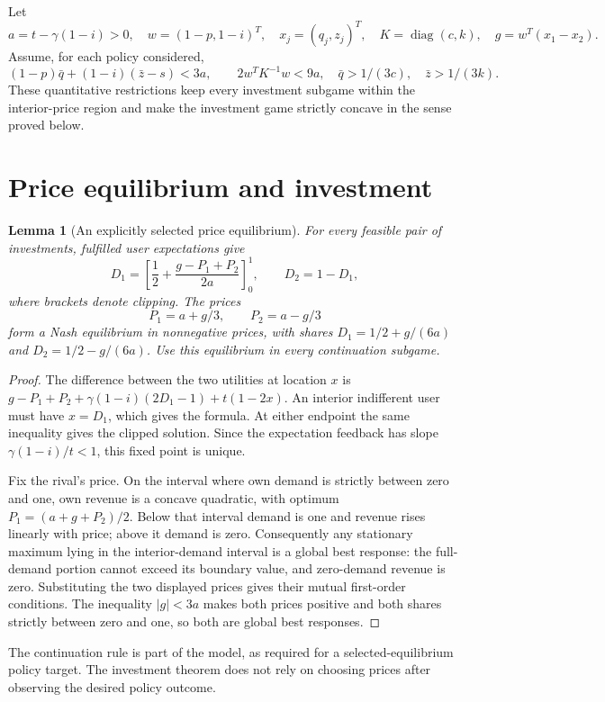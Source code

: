 \documentclass[11pt,a4paper]{article}
\newtheorem{lemma}[theorem]{Lemma}
\theoremstyle{definition}
\theoremstyle{remark}
\begin{document}
Let
\[
 a=t-\gamma(1-i)>0,\quad w=(1-p,1-i)^T,\quad
 x_j=(q_j,z_j)^T,\quad K=\operatorname{diag}(c,k),\quad
 g=w^T(x_1-x_2).
\]
Assume, for each policy considered,
\begin{equation}\label{eq:restrictions}
 (1-p)\bar q+(1-i)(\bar z-s)<3a,\qquad
 2w^TK^{-1}w<9a,
 \quad \bar q>1/(3c),\quad \bar z>1/(3k).
\end{equation}
These quantitative restrictions keep every investment subgame within the interior-price region and make the investment game strictly concave in the sense proved below.

\section{Price equilibrium and investment}
\begin{lemma}[An explicitly selected price equilibrium]\label{le:price}
For every feasible pair of investments, fulfilled user expectations give
\[
 D_1=\left[\frac12+\frac{g-P_1+P_2}{2a}\right]_0^1,
 \qquad D_2=1-D_1,
\]
where brackets denote clipping. The prices
\[
 P_1=a+g/3,\qquad P_2=a-g/3
\]
form a Nash equilibrium in nonnegative prices, with shares
$D_1=1/2+g/(6a)$ and $D_2=1/2-g/(6a)$. Use this equilibrium in every continuation subgame.
\end{lemma}
\begin{proof}
The difference between the two utilities at location $x$ is
$g-P_1+P_2+\gamma(1-i)(2D_1-1)+t(1-2x)$. An interior indifferent user must have $x=D_1$, which gives the formula. At either endpoint the same inequality gives the clipped solution. Since the expectation feedback has slope $\gamma(1-i)/t<1$, this fixed point is unique.

Fix the rival's price. On the interval where own demand is strictly between zero and one, own revenue is a concave quadratic, with optimum $P_1=(a+g+P_2)/2$. Below that interval demand is one and revenue rises linearly with price; above it demand is zero. Consequently any stationary maximum lying in the interior-demand interval is a global best response: the full-demand portion cannot exceed its boundary value, and zero-demand revenue is zero. Substituting the two displayed prices gives their mutual first-order conditions. The inequality $|g|<3a$ makes both prices positive and both shares strictly between zero and one, so both are global best responses.
\end{proof}

The continuation rule is part of the model, as required for a selected-equilibrium policy target. The investment theorem does not rely on choosing prices after observing the desired policy outcome.
\end{document}
